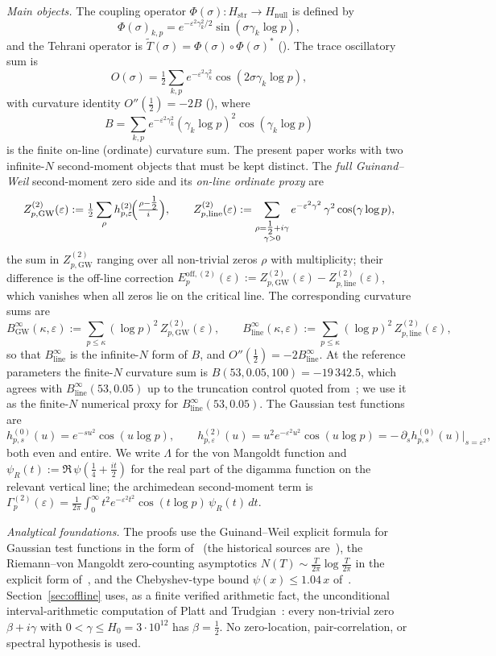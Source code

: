 \documentclass[11pt]{article}
\newcommand{\Hstr}{H_{\mathrm{str}}}
\newcommand{\Hnull}{H_{\mathrm{null}}}
\newcommand{\Tt}{\widetilde{T}}
\newcommand{\BinfGW}{B_{\mathrm{GW}}^{\infty}}   %
\newcommand{\Binfline}{B_{\mathrm{line}}^{\infty}} %
\newcommand{\ZtwoGW}{Z_{p,\mathrm{GW}}^{(2)}}   %
\newcommand{\Ztwoline}{Z_{p,\mathrm{line}}^{(2)}} %
\newcommand{\Gp}{\Gamma_p^{(2)}}            %
\newcommand{\Eoff}{E_p^{\mathrm{off},(2)}}  %
\newcommand{\psiR}{\psi_{R}}                %
\begin{document}
\medskip
\emph{Main objects.}
The coupling operator $\Phi(\sigma):\Hstr\to\Hnull$ is defined by
\[
\Phi(\sigma)_{k,p}=e^{-\varepsilon^2\gamma_k^2/2}\sin(\sigma\gamma_k\log p),
\]
and the Tehrani operator is $\Tt(\sigma)=\Phi(\sigma)\circ\Phi(\sigma)^*$
(\cite{Paper5}).
The trace oscillatory sum is
\[
O(\sigma)=\tfrac12\sum_{k,p}e^{-\varepsilon^2\gamma_k^2}\cos(2\sigma\gamma_k\log p),
\]
with curvature identity $O''(\tfrac12)=-2B$ (\cite{Paper6}), where
\[
B=\sum_{k,p}e^{-\varepsilon^2\gamma_k^2}(\gamma_k\log p)^2\cos(\gamma_k\log p)
\]
is the finite on-line (ordinate) curvature sum.
The present paper works with two infinite-$N$ second-moment objects that
must be kept distinct. The \emph{full Guinand--Weil} second-moment zero side
and its \emph{on-line ordinate proxy} are
\[
\ZtwoGW(\varepsilon)
 := \tfrac12\sum_\rho h^{(2)}_{p,\varepsilon}\!\Bigl(\tfrac{\rho-\tfrac12}{i}\Bigr),
\qquad
\Ztwoline(\varepsilon)
 := \sum_{\substack{\rho=\tfrac12+i\gamma\\ \gamma>0}}
    e^{-\varepsilon^2\gamma^2}\,\gamma^2\cos(\gamma\log p),
\]
the sum in $\ZtwoGW$ ranging over all non-trivial zeros $\rho$ with
multiplicity; their difference is the off-line correction
$\Eoff(\varepsilon):=\ZtwoGW(\varepsilon)-\Ztwoline(\varepsilon)$, which
vanishes when all zeros lie on the critical line. The corresponding
curvature sums are
\[
\BinfGW(\kappa,\varepsilon)
 := \sum_{p\le\kappa}(\log p)^2\,\ZtwoGW(\varepsilon),
\qquad
\Binfline(\kappa,\varepsilon)
 := \sum_{p\le\kappa}(\log p)^2\,\Ztwoline(\varepsilon),
\]
so that $\Binfline$ is the infinite-$N$ form of $B$, and
$O''(\tfrac12)=-2\Binfline$.
At the reference parameters the finite-$N$ curvature sum is
$B(53,0.05,100)=-19\,342.5$, which agrees with $\Binfline(53,0.05)$ up to the
truncation control quoted from~\cite{Paper6}; we use it as the finite-$N$
numerical proxy for $\Binfline(53,0.05)$.
The Gaussian test functions are
\[
h^{(0)}_{p,s}(u)=e^{-s u^2}\cos(u\log p),
\qquad
h^{(2)}_{p,\varepsilon}(u)=u^2 e^{-\varepsilon^2 u^2}\cos(u\log p)
 = -\,\partial_s h^{(0)}_{p,s}(u)\big|_{s=\varepsilon^2},
\]
both even and entire.
We write $\Lambda$ for the von Mangoldt function and
$\psiR(t):=\Re\,\psi(\tfrac14+\tfrac{it}{2})$ for the real part of the
digamma function on the relevant vertical line; the archimedean
second-moment term is
$\Gp(\varepsilon)=\frac{1}{2\pi}\int_0^\infty t^2 e^{-\varepsilon^2 t^2}
\cos(t\log p)\,\psiR(t)\,dt$.

\medskip
\emph{Analytical foundations.}
The proofs use the Guinand--Weil explicit formula for Gaussian test
functions in the form of~\cite[Thm.~5.12]{IwaniecKowalski04} (the
historical sources are~\cite{Guinand,Weil}), the Riemann--von Mangoldt
zero-counting asymptotics
$N(T)\sim\frac{T}{2\pi}\log\frac{T}{2\pi}$ in the explicit form
of~\cite{HasanalizadeShenWong21}, and the Chebyshev-type bound
$\psi(x)\le 1.04\,x$ of~\cite{RosserSchoenfeld62}.
Section~\ref{sec:offline} uses, as a finite verified arithmetic fact, the
unconditional interval-arithmetic computation of
Platt and Trudgian~\cite{PlattTrudgian21}: every non-trivial zero
$\beta+i\gamma$ with $0<\gamma\le H_0=3\cdot10^{12}$ has $\beta=\tfrac12$.
No zero-location, pair-correlation, or spectral hypothesis is used.
\end{document}
